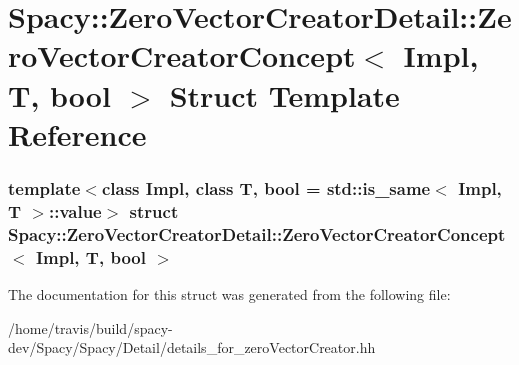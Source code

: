 \hypertarget{structSpacy_1_1ZeroVectorCreatorDetail_1_1ZeroVectorCreatorConcept}{\section{\-Spacy\-:\-:\-Zero\-Vector\-Creator\-Detail\-:\-:\-Zero\-Vector\-Creator\-Concept$<$ \-Impl, \-T, bool $>$ \-Struct \-Template \-Reference}
\label{structSpacy_1_1ZeroVectorCreatorDetail_1_1ZeroVectorCreatorConcept}
}
\subsubsection*{template$<$class Impl, class T, bool = std\-::is\-\_\-same$<$ Impl, T $>$\-::value$>$ struct Spacy\-::\-Zero\-Vector\-Creator\-Detail\-::\-Zero\-Vector\-Creator\-Concept$<$ Impl, T, bool $>$}



\-The documentation for this struct was generated from the following file\-:\begin{DoxyCompactItemize}
\item 
/home/travis/build/spacy-\/dev/\-Spacy/\-Spacy/\-Detail/details\-\_\-for\-\_\-zero\-Vector\-Creator.\-hh\end{DoxyCompactItemize}
